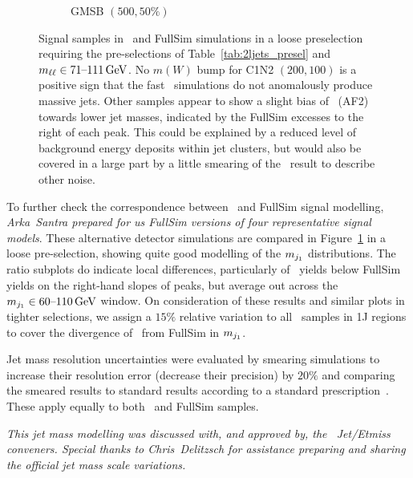 \begin{figure}[tp]
\begin{subfigure}{0.48\textwidth}
\caption{GMSB $(500, 50\%)$}
\end{subfigure}
\caption[
Signal samples in \afii\ and FullSim simulations in a loose preselection
]{%
Signal samples in \afii\ and FullSim simulations in a loose preselection
requiring the pre-selections of Table~\ref{tab:2ljets_presel} and
$\mll \in 71\textrm{--}111\,\eV[G]$.
No $m(W)$ bump for C1N2 $(200, 100)$ is a positive sign that the fast \afii\
simulations do not anomalously produce massive jets.
Other samples appear to show a slight bias of \afii\ (AF2) towards lower jet
masses, indicated by the FullSim excesses to the right of each peak.
This could be explained by a reduced level of background energy deposits within
jet clusters, but would also be covered in a large part by a little smearing of
the \afii\ result to describe other noise.
}
\label{fig:2ljets_jetm_afii_fullsim}
\end{figure}

To further check the correspondence between \afii\ and FullSim signal modelling,
\emph{Arka~Santra prepared for us FullSim versions of four representative
signal models}.
These alternative detector simulations are compared in
Figure~\ref{fig:2ljets_jetm_afii_fullsim} in a loose pre-selection,
showing quite good modelling of the $\mjetone$ distributions.
The ratio subplots do indicate local differences, particularly of \afii\ yields
below FullSim yields on the right-hand slopes of peaks, but average out
across the $\mjetone \in 60\textrm{--}110\,\eV[G]$ window.
On consideration of these results and similar plots in tighter selections,
we assign a $15\%$ relative variation to all \afii\ samples in 1J regions
to cover the divergence of \afii\ from FullSim in $\mjetone$.

Jet mass resolution uncertainties were evaluated by smearing simulations
to increase their resolution error (decrease their precision) by $20\%$
and comparing the smeared results to standard results according to a standard
prescription~\cite{atlas_twiki_jmr}.
These apply equally to both \afii\ and FullSim samples.

\emph{This jet mass modelling was discussed with, and approved by, the \atlas\
Jet/Etmiss conveners. Special thanks to Chris~Delitzsch for assistance
preparing and sharing the official jet mass scale variations.}



